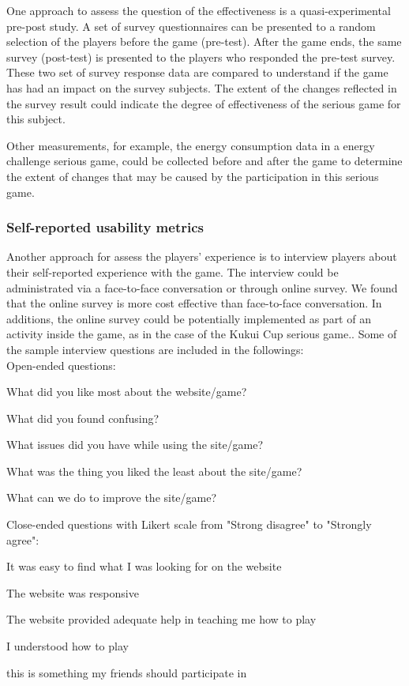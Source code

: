 One approach to assess the question of the effectiveness is a quasi-experimental pre-post
study. A set of survey questionnaires can be presented to a random selection of the players
before the game (pre-test). After the game ends, the same survey (post-test) is presented to the
players who responded the pre-test survey. These two set of survey response data are compared to
understand if the game has had an impact on the survey subjects. The extent of the changes reflected in the survey result could indicate the degree of effectiveness of the serious game for this subject.

Other measurements, for example, the energy consumption data in a energy challenge serious game, could be collected before and after the game to determine the extent of changes that may be caused by the participation in this serious game.

\subsubsection{Self-reported usability metrics}
\label{Self-reported usability metrics}

Another approach for assess the players' experience is to interview players about their self-reported
experience with the game. The interview could be administrated via a face-to-face conversation or through 
online survey. We found that the online survey is more cost effective than face-to-face conversation. 
In additions, the online survey could be potentially implemented as part of an activity inside the game, 
as in the case of the Kukui Cup serious game.\cite{csdl2-10-08}. Some of the sample interview questions are included in the followings:\\

Open-ended questions: 
\begin{compactitem}
\item What did you like most about the website/game?
\item What did you found confusing?
\item What issues did you have while using the site/game?
\item What was the thing you liked the least about the site/game?
\item What can we do to improve the site/game?\\
\end{compactitem}

Close-ended questions with Likert scale from "Strong disagree" to "Strongly agree": 
\begin{compactitem}
\item It was easy to find what I was looking for on the website
\item The website was responsive 
\item The website provided adequate help in teaching me how to play
\item I understood how to play
\item this is something my friends should participate in
\end{compactitem}

